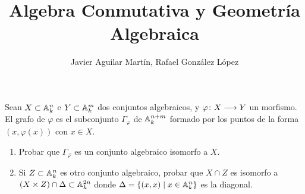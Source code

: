 \documentclass[twoside]{article}
\begin{document}
\title{Algebra Conmutativa y Geometría Algebraica}
\author{Javier Aguilar Martín, Rafael González López}
\maketitle
\begin{ejercicio}{4} Sean $X\subset \mathbb{A}_k^n$ e $Y\subset \mathbb{A}_k^m$ dos conjuntos algebraicos, y $\varphi\colon{X}\longrightarrow{Y}$ un morfismo. El grafo de $\varphi$ es el subconjunto $\Gamma_\varphi$ de $\mathbb{A}_k^{n+m}$ formado por los puntos de la forma $(x,\varphi(x))$ con $x\in X$.
\begin{enumerate}
\item Probar que $\Gamma_\varphi$ es un conjunto algebraico isomorfo a $X$.
\item Si $Z\subset \mathbb{A}_k^n$ es otro conjunto algebraico, probar que $X\cap Z$ es isomorfo a $(X\times Z)\cap \Delta \subset \mathbb{A}^{2n}_k$ donde $\Delta =\{(x,x)\mid x \in \mathbb{A}_k^n\}$ es la diagonal.
\end{enumerate}
\end{ejercicio}
\end{document}
